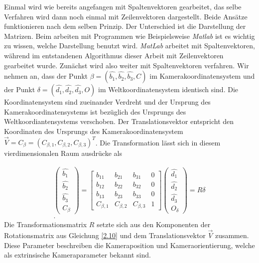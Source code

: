  Einmal wird wie bereits angefangen mit Spaltenvektoren gearbeitet, das selbe Verfahren wird dann noch einmal mit Zeilenvektoren dargestellt.  Beide Ansätze funktionieren nach dem selben Prinzip. Der Unterschied ist die Darstellung der Matrizen. Beim arbeiten mit Programmen wie Beispielsweise \textit{Matlab} ist es wichtig zu wissen, welche Darstellung benutzt wird. \textit{MatLab} arbeitet mit Spaltenvektoren, während im entstandenen Algorithmus dieser Arbeit mit Zeilenvektoren gearbeitet wurde. Zunächst wird also weiter mit Spaltenvektoren verfahren. 
 Wir nehmen an, dass der Punkt  $\beta = (\hat{b_1},\hat{b_2},\hat{b_3},C)$ im Kamerakoordinatensystem und der Punkt $\delta = (\hat{d_1},\hat{d_2},\hat{d_3},O)$ im Weltkoordinatensystem identisch sind. Die Koordinatensystem sind zueinander Verdreht und der Ursprung des Kamerakoordinatensystems ist bezüglich des Ursprungs des Weltkoordiantensystems verschoben. Der Translationsvektor entspricht den Koordinaten des Ursprungs des Kamerakoordinatensystem $\vec{V} = C_\beta = (C_{\beta,1}, C_{\beta,2}, C_{\beta,3})^T$. Die Transformation lässt sich in diesem vierdimensionalen Raum ausdrücke als  

	\begin{gather}
	\begin{pmatrix}
		\hat{b_1}\\
		\hat{b_2}\\
		\hat{b_3}\\
		C_\beta
	\end{pmatrix} = 
	\begin{bmatrix}
		b_{11} & b_{21} & b_{31} & 0\\
		b_{12} & b_{22} & b_{32} & 0\\
		b_{13} & b_{23} & b_{33} & 0\\
		C_{\beta,1} & C_{\beta,2} & C_{\beta,3} & 1 
	\end{bmatrix}
	\begin{pmatrix}
		\hat{d_1}\\
		\hat{d_2}\\
		\hat{d_3}\\
		O_\delta
	\end{pmatrix}
	= R\delta\\.
\end{gather}
Die Transformationsmatrix $R$ setzte sich aus den Komponenten der Rotationsmatrix aus Gleichung \ref{2.10} und dem Translationsvektor $\vec{V}$ zusammen. Diese Parameter beschreiben die Kameraposition und Kameraorientierung, welche als extrinsische Kameraparameter bekannt sind.    

